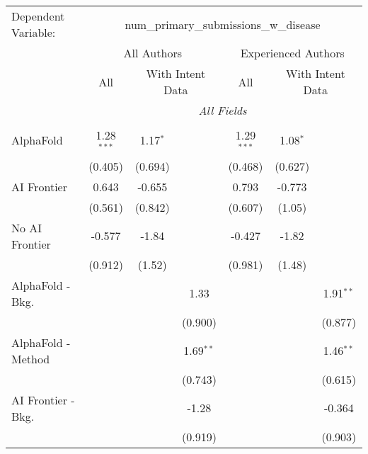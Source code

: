 \begingroup
\centering
\begin{tabular}{lcccccc}
   \tabularnewline \midrule \midrule
   Dependent Variable: & \multicolumn{6}{c}{num\_primary\_submissions\_w\_disease}\\
 & \multicolumn{3}{c}{All Authors} & \multicolumn{3}{c}{Experienced Authors} \\
\cmidrule(lr){2-4} \cmidrule(lr){5-7}
 & \multicolumn{1}{c}{All} & \multicolumn{2}{c}{With Intent Data} & \multicolumn{1}{c}{All} & \multicolumn{2}{c}{With Intent Data} \\
\cmidrule(lr){2-2} \cmidrule(lr){3-4} \cmidrule(lr){5-5} \cmidrule(lr){6-7}
 & \multicolumn{6}{c}{\textit{All Fields}} \\ \\
   AlphaFold               & 1.28$^{***}$ & 1.17$^{*}$ &               & 1.29$^{***}$ & 1.08$^{*}$ &   \\   
                           & (0.405)      & (0.694)    &               & (0.468)      & (0.627)    &   \\   
   AI Frontier             & 0.643        & -0.655     &               & 0.793        & -0.773     &   \\   
                           & (0.561)      & (0.842)    &               & (0.607)      & (1.05)     &   \\   
   No AI Frontier          & -0.577       & -1.84      &               & -0.427       & -1.82      &   \\   
                           & (0.912)      & (1.52)     &               & (0.981)      & (1.48)     &   \\   
   AlphaFold - Bkg.        &              &            & 1.33          &              &            & 1.91$^{**}$\\   
                           &              &            & (0.900)       &              &            & (0.877)\\   
   AlphaFold - Method      &              &            & 1.69$^{**}$   &              &            & 1.46$^{**}$\\   
                           &              &            & (0.743)       &              &            & (0.615)\\   
   AI Frontier - Bkg.      &              &            & -1.28         &              &            & -0.364\\   
                           &              &            & (0.919)       &              &            & (0.903)\\   

\end{tabular}
